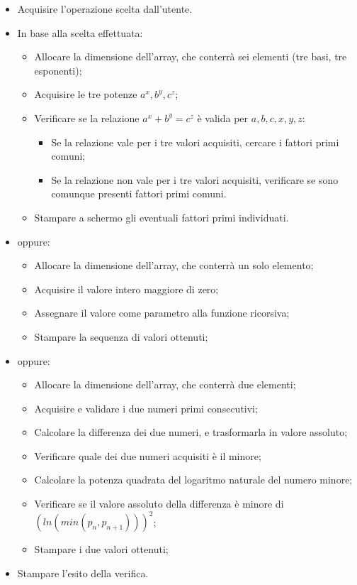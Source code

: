 \documentclass{article}
\begin{document}
\begin{itemize}
\item Acquisire l'operazione scelta dall'utente.
\item In base alla scelta effettuata:
    \begin{itemize}
    \item Allocare la dimensione dell'array, che conterrà sei elementi (tre basi, tre esponenti);
    \item Acquisire le tre potenze $a^x, b^y, c^z$;
    \item Verificare se la relazione $a^x + b^y = c^z$ è valida per $a,b,c,x,y,z$:
        \begin{itemize}
        \item Se la relazione vale per i tre valori acquisiti, cercare i fattori primi comuni;
        \item Se la relazione non vale per i tre valori acquisiti, verificare se sono comunque presenti fattori primi comuni. 
        \end{itemize}
    \item Stampare a schermo gli eventuali fattori primi individuati.
    \end{itemize}

    \item oppure:

    \begin{itemize}
    \item Allocare la dimensione dell'array, che conterrà un solo elemento;
    \item Acquisire il valore intero maggiore di zero;
    \item Assegnare il valore come parametro alla funzione ricorsiva;
    \item Stampare la sequenza di valori ottenuti;
    
    \end{itemize}

    \item oppure:
    \begin{itemize}
        \item Allocare la dimensione dell'array, che conterrà due elementi;
        \item Acquisire e validare i due numeri primi consecutivi;
        \item Calcolare la differenza dei due numeri, e trasformarla in valore assoluto;
        \item Verificare quale dei due numeri acquisiti è il minore;
        \item Calcolare la potenza quadrata del logaritmo naturale del numero minore;
        \item Verificare se il valore assoluto della differenza è minore di $(ln(min(p_n, p_{n+1})))^2$;
        \item Stampare i due valori ottenuti;
    \end{itemize}

    \item Stampare l'esito della verifica.
\end{itemize}
\end{document}
